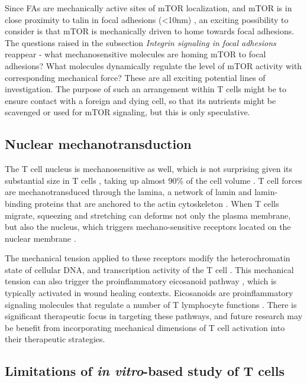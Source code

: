 Since FAs are mechanically active sites of mTOR localization, and mTOR is in close proximity to talin in focal adhesions (\textless 10nm) \cite{Rabanal-Ruiz2021}, an exciting possibility to consider is that mTOR is mechanically driven to home towards focal adhesions. The questions raised in the subsection \textit{Integrin signaling in focal adhesions} reappear - what mechanosensitive molecules are homing mTOR to focal adhesions? What molecules dynamically regulate the level of mTOR activity with corresponding mechanical force? These are all exciting potential lines of investigation. The purpose of such an arrangement within T cells might be to ensure contact with a foreign and dying cell, so that its nutrients might be scavenged or used for mTOR signaling, but this is only speculative.

\subsection{Nuclear mechanotransduction}

The T cell nucleus is mechanosensitive as well, which is not surprising given its substantial size in T cells \cite{McGregor2016}, taking up almost 90\% of the cell volume \cite{Strokotov2009}. T cell forces are mechanotransduced through the lamina, a network of lamin and lamin-binding proteins that are anchored to the actin cytoskeleton \cite{Rossy2018, Enyedi2017, Dahl2008}. When T cells migrate, squeezing and stretching can deforms not only the plasma membrane, but also the nucleus, which triggers mechano-sensitive receptors located on the nuclear membrane \cite{Dahl2008, Guilluy2014}. 

The mechanical tension applied to these receptors modify the heterochromatin state of cellular DNA, and transcription activity of the T cell \cite{Le2016}. This mechanical tension can also trigger the proinflammatory eicosanoid pathway \cite{Enyedi2017}, which is typically activated in wound healing contexts. Eicosanoids are proinflammatory signaling molecules that regulate a number of T lymphocyte functions \cite{Lone2013}. There is significant therapeutic focus in targeting these pathways, and future research may be benefit from incorporating mechanical dimensions of T cell activation into their therapeutic strategies. 

\subsection{Limitations of \textit{in vitro}-based study of T cells}

